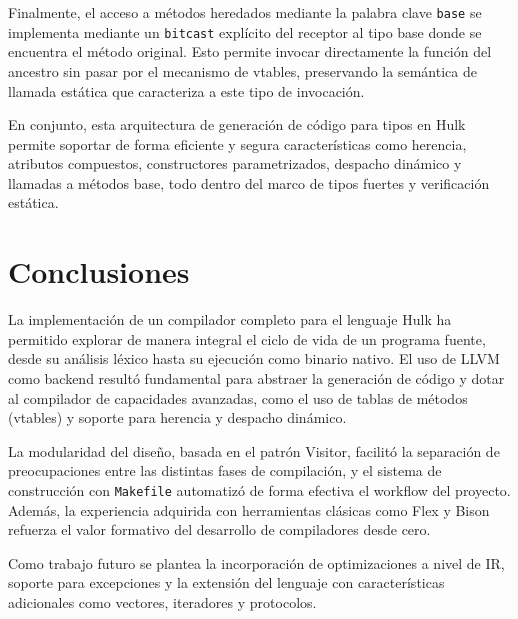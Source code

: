 \documentclass{llncs}
\begin{document}
	Finalmente, el acceso a métodos heredados mediante la palabra clave \texttt{base} se implementa mediante un \texttt{bitcast} explícito del receptor al tipo base donde se encuentra el método original. Esto permite invocar directamente la función del ancestro sin pasar por el mecanismo de vtables, preservando la semántica de llamada estática que caracteriza a este tipo de invocación.

	En conjunto, esta arquitectura de generación de código para tipos en Hulk permite soportar de forma eficiente y segura características como herencia, atributos compuestos, constructores parametrizados, despacho dinámico y llamadas a métodos base, todo dentro del marco de tipos fuertes y verificación estática.

	\section{Conclusiones}

	La implementación de un compilador completo para el lenguaje Hulk ha permitido explorar de manera integral el ciclo de vida de un programa fuente, desde su análisis léxico hasta su ejecución como binario nativo. El uso de LLVM como backend resultó fundamental para abstraer la generación de código y dotar al compilador de capacidades avanzadas, como el uso de tablas de métodos (vtables) y soporte para herencia y despacho dinámico.

	La modularidad del diseño, basada en el patrón Visitor, facilitó la separación de preocupaciones entre las distintas fases de compilación, y el sistema de construcción con \texttt{Makefile} automatizó de forma efectiva el workflow del proyecto. Además, la experiencia adquirida con herramientas clásicas como Flex y Bison refuerza el valor formativo del desarrollo de compiladores desde cero.

	Como trabajo futuro se plantea la incorporación de optimizaciones a nivel de IR, soporte para excepciones y la extensión del lenguaje con características adicionales como vectores, iteradores y protocolos.
\end{document}
